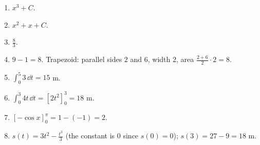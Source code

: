 \begin{enumerate}[label=\textbf{\ansnum.\arabic*}]
  \item $x^3+C$.
  \item $x^2+x+C$.
  \item $\frac{8}{3}$.
  \item $9-1=8$. Trapezoid: parallel sides $2$ and $6$, width $2$, area $\frac{2+6}{2}\cdot 2=8$.
  \item $\int_0^5 3\,\dd t=15$ m.
  \item $\int_0^3 4t\,\dd t=[2t^2]_0^3=18$ m.
  \item $[-\cos x]_0^{\pi}=1-(-1)=2$.
  \item[\textbf{\ansnum.8}] $s(t)=3t^2-\frac{t^3}{3}$ (the constant is $0$ since $s(0)=0$); $s(3)=27-9=18$ m.
\end{enumerate}
